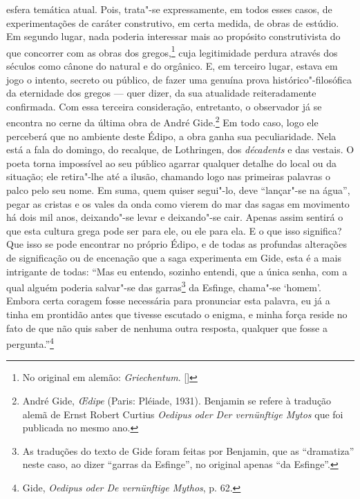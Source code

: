 esfera temática atual. Pois, trata"-se expressamente, em todos esses
casos, de experimentações de caráter construtivo, em certa medida, de
obras de estúdio. Em segundo lugar, nada poderia
interessar mais ao propósito construtivista do que concorrer com as obras
dos gregos,\footnote{No original em alemão: \emph{Griechentum}. []} cuja legitimidade perdura através dos
séculos como cânone do natural e do orgânico. E, em terceiro lugar,
estava em jogo o intento, secreto ou público, de fazer uma genuína prova
histórico"-filosófica da eternidade dos gregos --- quer dizer, da sua
atualidade reiteradamente confirmada. Com essa terceira consideração,
entretanto, o observador já se encontra no cerne da última obra de André
Gide.\footnote{André Gide, \emph{\OE dipe} (Paris: Pléiade, 1931).
  Benjamin se refere à tradução alemã de Ernst Robert Curtius
  \emph{Oedipus oder Der vernünftige Mytos} que foi publicada no mesmo
  ano. \versal{[N. T.]}} Em todo caso, logo ele perceberá que no ambiente deste Édipo, a
obra ganha sua peculiaridade. Nela está a fala do domingo, do recalque, de
Lothringen, dos \emph{décadents} e das vestais. O poeta torna %
impossível ao seu público agarrar qualquer detalhe do local ou da
situação; ele retira"-lhe até a ilusão, chamando logo nas primeiras
palavras o palco pelo seu nome. Em suma, quem quiser segui"-lo, deve
``lançar"-se na água'', pegar as cristas e os vales da onda como vierem
do mar das sagas em movimento há dois mil anos, deixando"-se levar e
deixando"-se cair. Apenas assim sentirá o que esta cultura grega pode
ser para ele, ou ele para ela. E o que isso significa? Que
isso se pode encontrar no próprio Édipo, e de todas as profundas alterações de significação ou de
encenação que a saga experimenta em Gide, esta é a mais intrigante de
todas: ``Mas eu entendo, sozinho entendi, que a única senha, com a qual
alguém poderia salvar"-se das garras\footnote{As traduções do texto
  de Gide foram feitas por Benjamin, que as ``dramatiza'' neste caso, ao
  dizer ``garras da Esfinge'', no original apenas ``da Esfinge''. \versal{[N. E.]}} da
Esfinge, chama"-se `homem'. Embora certa coragem fosse necessária para
pronunciar esta palavra, eu já a tinha em prontidão antes que tivesse
escutado o enigma, e minha força reside no fato de que não quis saber de
nenhuma outra resposta, qualquer que fosse a pergunta.''\footnote{Gide, \emph{Oedipus oder De vernünftige Mythos}, p. 62. \versal{[N. T.]}}

